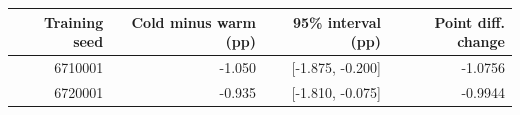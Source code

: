 \begin{tabular}{rrrr}
\toprule
Training seed & Cold minus warm (pp) & 95\% interval (pp) & Point diff. change \\
\midrule
6710001 & -1.050 & [-1.875, -0.200] & -1.0756 \\
6720001 & -0.935 & [-1.810, -0.075] & -0.9944 \\
\bottomrule
\end{tabular}
